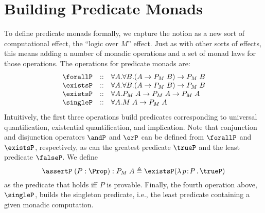 \documentclass[preprint]{sigplanconf}
\begin{document}
\section{Building Predicate Monads}

To define predicate monads formally, we capture the notion as a new sort of
computational effect, the ``logic over $M$'' effect. Just as with other sorts of
effects, this means adding a number of monadic operations and a set of monad
laws for those operations. The operations for predicate monads are:
\[
\begin{array}{lcl}
  \forallP & :: & \forall A.\forall B.(A\to P_M\;B) \to P_M\;B\\
  \existsP & :: & \forall A.\forall B.(A\to P_M\;B) \to P_M\;B\\
  \existsP & :: & \forall A.P_M\;A \to P_M\;A \to P_M\;A\\
  \singleP & :: & \forall A.M\;A \to P_M\;A\\
\end{array}
\]
Intuitively, the first three operations build predicates corresponding to
universal quantification, existential quantification, and implication. Note that
conjunction and disjunction operators $\andP$ and $\orP$ can be defined from
$\forallP$ and $\existsP$, respectively, as can the greatest predicate $\trueP$
and the least predicate $\falseP$. We define
\[
\assertP\;(P:\Prop) : P_M\;A \triangleq \existsP (\lamabs{p}{P}{\trueP})
\]
as the predicate that holds iff $P$ is provable.  Finally, the fourth operation
above, $\singleP$, builds the singleton predicate, i.e., the least predicate
containing a given monadic computation.
\end{document}
